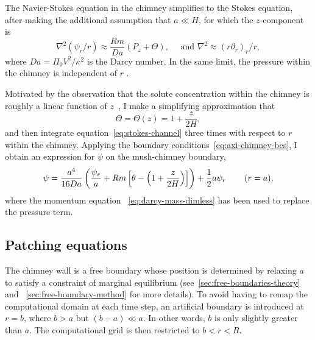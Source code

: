 \documentclass[11pt]{proc}
\makeatletter
\newcommand{\specialeqref}[2]{\begingroup
  \def\tagform@##1{\maketag@@@{(\ignorespaces##1\unskip\@@italiccorr#2)}}%
  \eqref{#1}\endgroup}
\makeatother
\begin{document}
The Navier-Stokes equation in the chimney simplifies to the Stokes equation, after making the additional assumption that $a \ll H$, for which the $z$-component is
\begin{equation}
\label{eq:stokes-channel}
\nabla^2 (\psi_r/r) \approx \frac{Rm}{Da} \left(P_z + \Theta \right), \quad \text{ and } \nabla^2 \approx (r \partial_r)_r/r,
\end{equation}
where $Da=\Pi_0 V^2 / \kappa^2$ is the Darcy number. In the same limit, the pressure within the chimney is independent of $r$ \citep*{schulze-worster-98}.

Motivated by the observation that the solute concentration within the chimney is roughly a linear function of $z$~\citep*{rees-jones-worster-13}, I make a simplifying approximation that
\begin{equation}
\Theta = \Theta(z) = 1 + \frac{z}{2H},
\end{equation}
and then integrate equation~\eqref{eq:stokes-channel} three times with respect to $r$ within the chimney. Applying the boundary conditions~\eqref{eq:axi-chimney-bcs}, I obtain an expression for $\psi$ on the mush-chimney boundary,
\begin{equation}
\psi = \frac{a^4}{16 Da} \left(\frac{\psi_r}{a} + Rm \left[ \theta -  \left( 1 + \frac{z}{2H} \right) \right] \right)   + \frac{1}{2} a \psi_r   \hspace{5ex} (r=a),
\end{equation}
where the momentum equation~\specialeqref{eq:darcy-mass-dimless}{a} has been used to replace the pressure term.

\subsection{Patching equations}
\label{sec:patching-equations}
The chimney wall is a free boundary whose position is determined by relaxing $a$ to satisfy a constraint of marginal equilibrium (see~\autoref{sec:free-boundaries-theory} and ~\autoref{sec:free-boundary-method} for more details). To avoid having to remap the computational domain at each time step, an artificial boundary is introduced at $r=b$, where $b > a$ but $(b-a) \ll a$. In other words, $b$ is only slightly greater than $a$. The computational grid is then restricted to $b < r < R$. 
\end{document}
